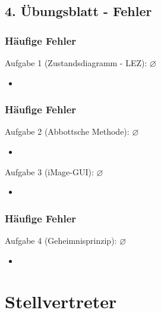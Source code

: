 \documentclass[18pt]{beamer}
\begin{document}
	\subsection{4. Übungsblatt - Fehler}
	\begin{frame}
		\frametitle{Häufige Fehler}
		\begin{block}{Aufgabe 1 (Zustandsdiagramm - LEZ): $\diameter$}%
			\begin{itemize}
				\item %
			\end{itemize}
		\end{block}
	\end{frame}

	\begin{frame}
		\frametitle{Häufige Fehler}
		\begin{block}{Aufgabe 2 (Abbottsche Methode): $\diameter$}%
			\begin{itemize}
				\item %
			\end{itemize}
		\end{block}
		\begin{block}{Aufgabe 3 (iMage-GUI): $\diameter$}%
			\begin{itemize}
				\item	%
			\end{itemize}
		\end{block}
	\end{frame}

	\begin{frame}
		\frametitle{Häufige Fehler}
		\begin{block}{Aufgabe 4 (Geheimnisprinzip): $\diameter$}%
			\begin{itemize}
				\item %
			\end{itemize}
		\end{block}
	\end{frame}


\section{Stellvertreter}
\end{document}

